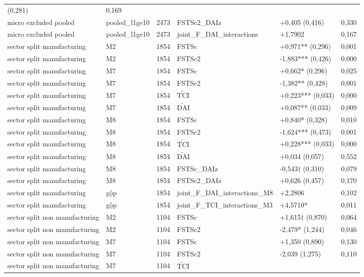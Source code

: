 \documentclass[12pt,a4paper]{article}
\begin{document}
\begin{longtable}[]{@{}llllll@{}}
(0,281) & 0,169 \\
micro excluded pooled & pooled\_l1ge10 & 2473 & FSTSc2\_DAIz & +0,405
(0,416) & 0,330 \\
micro excluded pooled & pooled\_l1ge10 & 2473 &
joint\_F\_DAI\_interactions & +1,7902 & 0,167 \\
sector split manufacturing & M2 & 1854 & FSTSc & +0,971** (0,296) &
0,001 \\
sector split manufacturing & M2 & 1854 & FSTSc2 & -1,883*** (0,426) &
0,000 \\
sector split manufacturing & M7 & 1854 & FSTSc & +0,662* (0,296) &
0,025 \\
sector split manufacturing & M7 & 1854 & FSTSc2 & -1,382** (0,428) &
0,001 \\
sector split manufacturing & M7 & 1854 & \(\tilde{\mathrm{TCI}}\) &
+0,223*** (0,033) & 0,000 \\
sector split manufacturing & M7 & 1854 & \(\tilde{\mathrm{DAI}}\) &
+0,087** (0,033) & 0,009 \\
sector split manufacturing & M8 & 1854 & FSTSc & +0,840* (0,328) &
0,010 \\
sector split manufacturing & M8 & 1854 & FSTSc2 & -1,624*** (0,473) &
0,001 \\
sector split manufacturing & M8 & 1854 & \(\tilde{\mathrm{TCI}}\) &
+0,228*** (0,033) & 0,000 \\
sector split manufacturing & M8 & 1854 & \(\tilde{\mathrm{DAI}}\) &
+0,034 (0,057) & 0,552 \\
sector split manufacturing & M8 & 1854 & FSTSc\_DAIz & -0,543† (0,310) &
0,079 \\
sector split manufacturing & M8 & 1854 & FSTSc2\_DAIz & +0,626 (0,457) &
0,170 \\
sector split manufacturing & gộp & 1854 &
joint\_F\_DAI\_interactions\_M8 & +2,2806 & 0,102 \\
sector split manufacturing & gộp & 1854 &
joint\_F\_TCI\_interactions\_M3 & +4,5710* & 0,011 \\
sector split non manufacturing & M2 & 1104 & FSTSc & +1,615† (0,870) &
0,064 \\
sector split non manufacturing & M2 & 1104 & FSTSc2 & -2,479* (1,244) &
0,046 \\
sector split non manufacturing & M7 & 1104 & FSTSc & +1,350 (0,890) &
0,130 \\
sector split non manufacturing & M7 & 1104 & FSTSc2 & -2,039 (1,275) &
0,110 \\
sector split non manufacturing & M7 & 1104 & \(\tilde{\mathrm{TCI}}\) &

\end{longtable}
\end{document}

